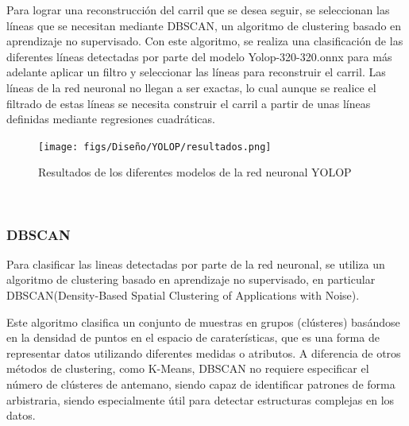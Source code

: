 Para lograr una reconstrucción del carril que se desea seguir, se seleccionan las líneas que se necesitan mediante DBSCAN, un algoritmo de clustering basado en aprendizaje no supervisado. 
Con este algoritmo, se realiza una clasificación de las diferentes líneas detectadas por parte del modelo Yolop-320-320.onnx para más adelante aplicar un filtro y seleccionar las líneas 
para reconstruir el carril. Las líneas de la red neuronal no llegan a ser exactas, lo cual aunque se realice el filtrado de estas líneas se necesita construir el carril a partir de unas líneas 
definidas mediante regresiones cuadráticas. 
\begin{figure} [H]
  \begin{center}
    \texttt{[image: figs/Diseño/YOLOP/resultados.png]}
  \end{center}
  \caption{Resultados de los diferentes modelos de la red neuronal YOLOP}
  \label{Resultados de los diferentes modelos de la red neuronal YOLOP}
\end{figure}\

\subsubsection{DBSCAN}
\label{sec:DBSCAN}

Para clasificar las lineas detectadas por parte de la red neuronal, se utiliza un algoritmo de clustering basado en aprendizaje no supervisado, en particular
DBSCAN(Density-Based Spatial Clustering of Applications with Noise)\cite{ski_dbs}.\newline

Este algoritmo clasifica un conjunto de muestras en grupos (clústeres) basándose en la densidad de puntos en el espacio de caraterísticas, que es una forma de representar
datos utilizando diferentes medidas o atributos. A diferencia de otros métodos de clustering, como K-Means, DBSCAN no requiere especificar el número de clústeres de antemano, 
siendo capaz de identificar patrones de forma arbistraria, siendo especialmente útil para detectar estructuras complejas en los datos. 

